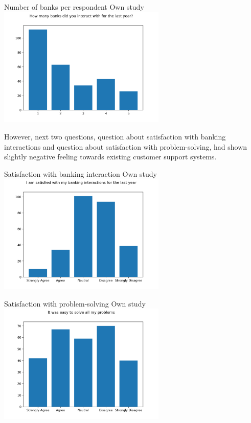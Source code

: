 \mtfigure
{Number of banks per respondent}
{Own study}
{
    \includegraphics[width=0.6\textwidth,height=\textheight,keepaspectratio]{survey/2_how_many_banks_did_you_interact_with_for_the_last_year?.png}
}

However, next two questions, question about satisfaction with banking interactions and question about satisfaction with problem-solving, had shown slightly negative feeling towards existing customer support systems.

\mtfigure
{Satisfaction with banking interaction}
{Own study}
{
    \includegraphics[width=0.6\textwidth,height=\textheight,keepaspectratio]{survey/3_i_am_satisfied_with_my_banking_interactions_for_the_last_year.png}
}

\mtfigure
{Satisfaction with problem-solving}
{Own study}
{
    \includegraphics[width=0.6\textwidth,height=\textheight,keepaspectratio]{survey/4_it_was_easy_to_solve_all_my_problems.png}
}

